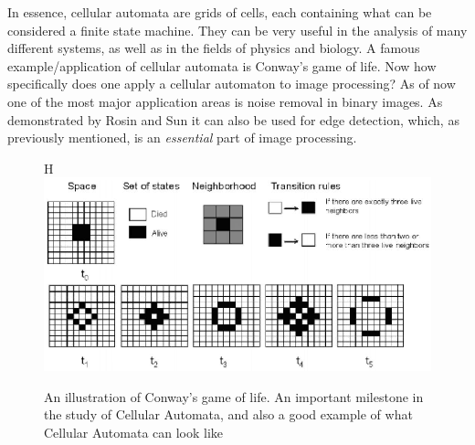 \documentclass[twoside,a4paper,article]{combine}
\begin{document}
In essence, cellular automata are grids of cells, each containing what can be considered a finite state machine. They can be very useful in the analysis of many different systems, as well as in the fields of physics and biology. A famous example/application of cellular automata is Conway's game of life\cite{gardnermathematical}.
Now how specifically does one apply a cellular automaton to image processing?  As of now one of the most major application areas is noise removal in binary images. \cite{inproceedings} As demonstrated by Rosin and Sun\cite{rosin} it can also be used for edge detection, which, as previously mentioned, is an \textit{essential} part of image processing.
\begin{figure}{H}
    \centering
    \includegraphics[width=1\linewidth]{gameoflife.png}
    \caption{An illustration of Conway's game of life. An important milestone in the study of Cellular Automata, and also a good example of what Cellular Automata can look like}
    \label{fig:enter-label}
\end{figure}
\end{document}
